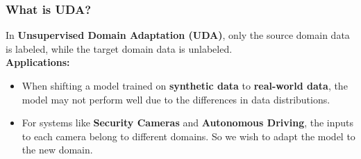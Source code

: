 \documentclass{beamer}
\begin{document}
\begin{frame}
    \frametitle{What is UDA?}
    In \textbf{Unsupervised Domain Adaptation (UDA)}, only the source domain data is labeled, while the target domain data is unlabeled.\\

    \textbf{Applications:} 
    \begin{itemize}
        \item When shifting a model trained on \textbf{synthetic data} to \textbf{real-world data}, the model may not perform well due to the differences in data distributions.
        \item For systems like \textbf{Security Cameras} and \textbf{Autonomous Driving}, the inputs to each camera belong to different domains. So we wish to adapt the model to the new domain.
    \end{itemize}

    

\end{frame}


\end{document}
